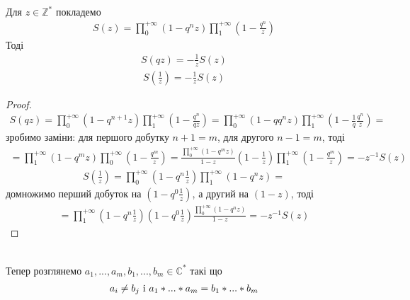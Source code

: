 \documentclass[12pt,a4paper]{article}
\begin{document}
\begin{twerd} Для $z \in \mathbb{Z}^{*}$ покладемо
\[\begin{array}{l} 
 S(z)= \prod_{0}^{+\infty } ( 1-q^{n}z ) \prod_{1}^{+\infty }( 1-\frac{q^{n}}{z})
 \end{array}\]
Тоді
\begin{equation}\label{s1}
\begin{array}{l}
   S(qz)=-\frac{1}{z}S(z)
 \end{array}
\end{equation}  
\begin{equation}\label{s2}
\begin{array}{l}        
   S(\frac{1}{z})= -\frac{1}{z}S(z)
\end{array}
\end{equation}
\end{twerd}
\begin{proof}
\[\begin{array}{l} 
S(qz)= \prod_{0}^{+\infty } ( 1-q^{n+1}z ) \prod_{1}^{+\infty }( 1-\frac{q^{n}}{qz})=
 \prod_{0}^{+\infty } ( 1-qq^{n}z ) \prod_{1}^{+\infty }( 1-\frac{1}{q}\frac{q^{n}}{z})=
 \end{array}\]
зробимо заміни: для першого добутку $n+1=m$, для другого $n-1=m$, тоді 
\[\begin{array}{l} 
 =\prod_{1}^{+\infty } ( 1-q^{m}z ) \prod_{0}^{+\infty }( 1-\frac{q^{m}}{z})=\frac{\prod_{0}^{+\infty } ( 1-q^{m}z )}{1-z}(1-\frac{1}{z})\prod_{1}^{+\infty }( 1-\frac{q^{m}}{z})=-z^{-1}S(z)
\end{array}\]
\[\begin{array}{l} 
 S(\frac{1}{z})= \prod_{0}^{+\infty } ( 1-q^{n}\frac{1}{z} ) \prod_{1}^{+\infty }( 1-q^{n}z)=
\end{array}\]
домножимо перший добуток на $(1-q^{0}\frac{1}{z})$, а другий на $(1-z)$, тоді 
\[\begin{array}{l} 
  =\prod_{1}^{+\infty } ( 1-q^{n}\frac{1}{z} )(1-q^{0}\frac{1}{z})\frac{    \prod_{0}^{+\infty }( 1-q^{n}z)}{1-z}=-z^{-1}S(z)
 \end{array}\]
\end{proof}
\[\begin{array}{l}
\end{array} \]

Тепер розглянемо $a_{1},...,a_{m},b_{1},...,b_{m}\in \mathbb{C}^{*}$ такі що\\
\begin{equation}\label{w1}
\begin{array}{l} 
 a_{i}\neq b_{j}$  i  $a_{1}*...*a_{m}=b_{1}*...*b_{m}
\end{array}
\end{equation} 
\end{document}
